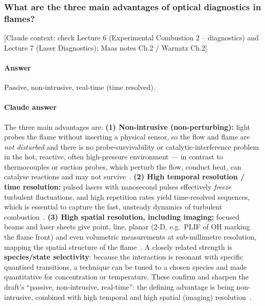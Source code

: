 \subsubsection{What are the three main advantages of optical diagnostics in flames?}

{\color{gray}\footnotesize [Claude context: check Lecture 6 (Experimental Combustion 2 -- diagnostics) and Lecture 7 (Laser Diagnostics); Maas notes Ch.2 / Warnatz Ch.2]}

\paragraph{Answer} Passive, non-intrusive, real-time (time resolved).

{\color{istblue}
\paragraph{Claude answer}
The three main advantages are: \textbf{(1) Non-intrusive (non-perturbing):} light probes the flame without inserting a physical sensor, so the flow and flame are \emph{not disturbed} and there is no probe-survivability or catalytic-interference problem in the hot, reactive, often high-pressure environment --- in contrast to thermocouples or suction probes, which perturb the flow, conduct heat, can catalyse reactions and may not survive~\cite{lecture7,crosley1983}. \textbf{(2) High temporal resolution / time resolution:} pulsed lasers with nanosecond pulses effectively \emph{freeze} turbulent fluctuations, and high repetition rates yield time-resolved sequences, which is essential to capture the fast, unsteady dynamics of turbulent combustion~\cite{lecture7}. \textbf{(3) High spatial resolution, including imaging:} focused beams and laser sheets give point, line, planar (2-D, e.g.\ PLIF of OH marking the flame front) and even volumetric measurements at sub-millimetre resolution, mapping the spatial structure of the flame~\cite{lecture7}. A closely related strength is \textbf{species/state selectivity}: because the interaction is resonant with specific quantised transitions, a technique can be tuned to a chosen species and made quantitative for concentration or temperature. These confirm and sharpen the draft's ``passive, non-intrusive, real-time'': the defining advantage is being non-intrusive, combined with high temporal and high spatial (imaging) resolution~\cite{lecture7,warnatz2006combustion}.
}






